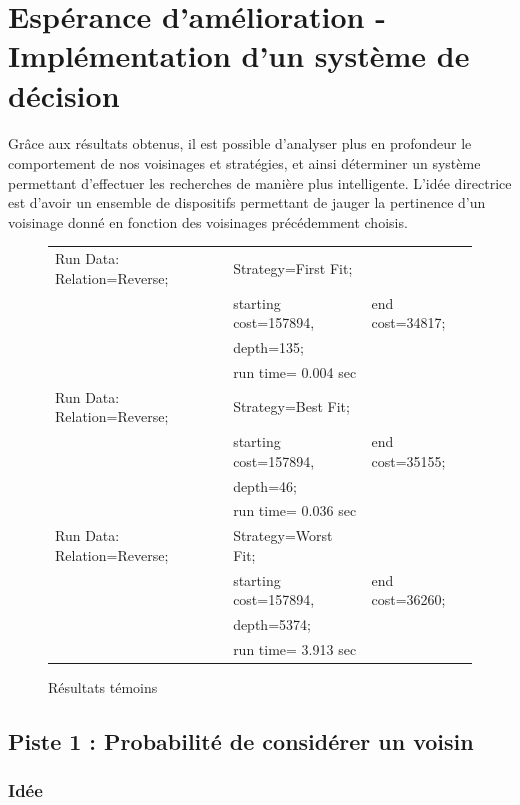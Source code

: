 \documentclass[a4paper,10pt]{report}
\begin{document}

\section{Espérance d'amélioration - Implémentation d'un système de décision}

\paragraph{}
  Grâce aux résultats obtenus, il est possible d'analyser plus en profondeur le
comportement de nos voisinages et stratégies, et ainsi déterminer un système
permettant d'effectuer les recherches de manière plus intelligente. L'idée
directrice est d'avoir un ensemble de dispositifs permettant de jauger la
pertinence d'un voisinage donné en fonction des voisinages précédemment choisis.


\begin{figure}[h]
  \begin{tabular}{lll}
    Run Data: Relation=Reverse;&
      Strategy=First Fit;\\
      &starting cost=157894,&
      end cost=34817;\\
      &depth=135;\\
      &run time= 0.004 sec\\
    Run Data: Relation=Reverse;&
      Strategy=Best Fit;\\
      &starting cost=157894,&
      end cost=35155;\\
      &depth=46;\\
      &run time= 0.036 sec\\
    Run Data: Relation=Reverse;&
      Strategy=Worst Fit;\\
      &starting cost=157894,&
      end cost=36260;\\
      &depth=5374;\\
      &run time= 3.913 sec\\
  \end{tabular}
  \caption{Résultats témoins}
\end{figure}


\subsection{Piste 1 : Probabilité de considérer un voisin}
\subsubsection{Idée}
\end{document}
